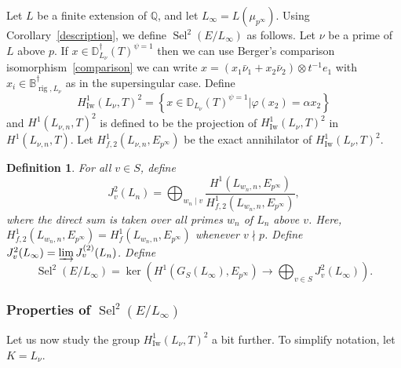 \documentclass{amsart}
\newcommand{\QQ}{\mathbb Q}
\newcommand{\BB}{\mathbb B}
\newcommand{\DD}{\mathbb D}
\DeclareMathOperator{\Sel}{Sel}
\DeclareMathOperator{\Iw}{Iw}
\DeclareMathOperator{\rig}{rig}
\newcommand{\Ep}{E_{p^\infty}}
\newcommand{\vp}{\varphi}
\newtheorem{definition}[theorem]{Definition}
\begin{document}
  Let $L$ be a finite extension of $\QQ$, and let $L_\infty=L(\mu_{p^\infty})$. Using Corollary~\ref{description}, we define $\Sel^2(E\slash L_\infty)$ as follows.  Let $\nu$ be a prime of $L$ above $p$. If $x\in \DD^\dagger_{L_\nu}(T)^{\psi=1}$ then we can use Berger's comparison isomorphism~\eqref{comparison} we can write $x=(x_1 \bar{\nu}_1+ x_2 \bar{\nu}_2)\otimes t^{-1}e_1$ with $x_i\in \BB^\dagger_{\rig,L_\nu}$ as in the supersingular case. Define
  \[
  H^1_{\Iw}(L_\nu,T)^2=\left\{x\in\DD_{L_{\nu}}(T)^{\psi=1}|\vp(x_2)=\alpha x_2\right\}
  \]
  and $H^1(L_{\nu,n},T)^2$ is defined to be the projection of $H^1_{\Iw}(L_\nu,T)^2$ in $H^1(L_{\nu,n},T)$. Let $H^1_{f,2}(L_{\nu,n},\Ep)$ be the exact annihilator of $H^1_{\Iw}(L_\nu,T)^2$.
  
  \begin{definition}
   For all $v\in S$, define 
   \[ J^2_v(L_n)= \bigoplus_{w_n\mid v}  \frac{H^1(L_{w_n,n},\Ep)}{H^1_{f,2}(L_{w_n,n},\Ep)},\] 
   where the direct sum is taken over all primes $w_n$ of $L_n$ above $v$. Here, $H^1_{f,2}(L_{w_n,n},\Ep)=H^1_f(L_{w_n,n},\Ep)$ whenever $v\nmid p$. Define $J^{2}_v(L_\infty)=\varinjlim J^{(2)}_v(L_n)$. Define
   \[ \Sel^2(E\slash L_\infty)=\ker\left( H^1(G_S(L_\infty),\Ep)\rightarrow \bigoplus_{v\in S}J^2_v(L_\infty)\right).\] 
  \end{definition}



  \subsubsection{Properties of $\Sel^2(E\slash L_\infty)$}

   Let us now study the group $H^1_{\Iw}(L_\nu,T)^2$ a bit further. To simplify notation, let $K=L_\nu$.
\end{document}
